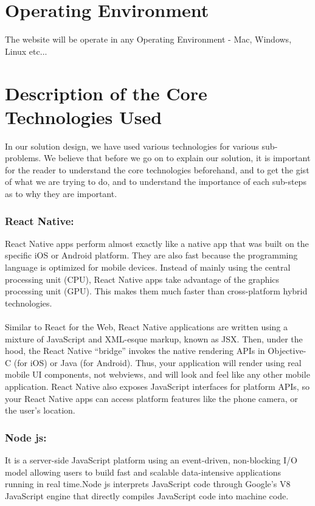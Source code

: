 \documentclass{scrreprt}
\begin{document}
\section{Operating Environment}
The website will be operate in any Operating Environment - Mac, Windows, Linux etc... 

\section{Description of the Core Technologies Used}
In our solution design, we have used various technologies for various sub-problems. We believe that before we go on to explain our solution, it is important for the reader to understand the core technologies beforehand, and to get the gist of what we are trying to do, and to understand the importance of each sub-steps as to why they are important. \\


\subsubsection{\textbf{React Native:}}
React Native apps perform almost exactly like a native app that was built on the specific iOS or Android platform. They are also fast because the programming language is optimized for mobile devices. Instead of mainly using the central processing unit (CPU), React Native apps take advantage of the graphics processing unit (GPU). This makes them much faster than cross-platform hybrid technologies.\\ \\
Similar to React for the Web, React Native applications are written using a mixture of JavaScript and XML-esque markup, known as JSX. Then, under the hood, the React Native “bridge” invokes the native rendering APIs in Objective-C (for iOS) or Java (for Android). Thus, your application will render using real mobile UI components, not webviews, and will look and feel like any other mobile application. React Native also exposes JavaScript interfaces for platform APIs, so your React Native apps can access platform features like the phone camera, or the user’s location. \\


\subsubsection{\textbf{Node js:}}
It is a server-side JavaScript platform using an event-driven, non-blocking I/O model allowing users to build fast and scalable data-intensive applications running in real time.Node js interprets JavaScript code through Google’s V8 JavaScript engine that directly compiles JavaScript code into machine code. \\
\end{document}
